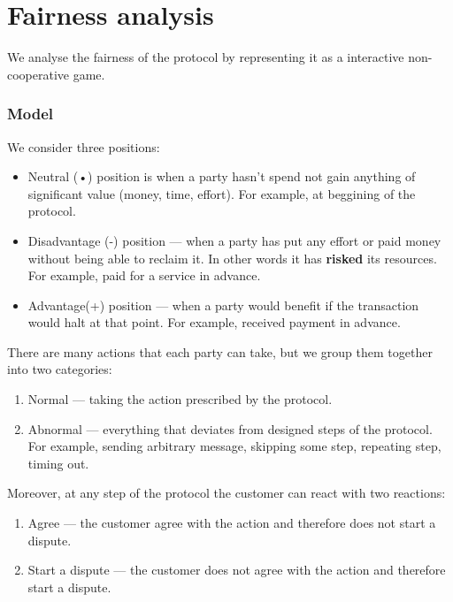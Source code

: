 \documentclass{ieeeaccess}
\begin{document}
\section{Fairness analysis}
We analyse the fairness of the protocol by representing it as a
interactive non-cooperative game.

\subsubsection{Model}\label{model}

We consider three positions:

\begin{itemize}
\item
  Neutral (•) position is when a party hasn't spend not gain anything of
  significant value (money, time, effort). For example, at beggining of
  the protocol.
\item
  Disadvantage (-) position — when a party has put any effort or paid
  money without being able to reclaim it. In other words it has
  \textbf{risked} its resources. For example, paid for a service in
  advance.
\item
  Advantage(+) position — when a party would benefit if the
  transaction would halt at that point. For example, received payment in
  advance.
\end{itemize}

There are many actions that each party can take, but we group them
together into two categories:

\begin{enumerate}
\def\labelenumi{\arabic{enumi}.}

\item
  Normal --- taking the action prescribed by the protocol.
\item
  Abnormal --- everything that deviates from designed steps of the
  protocol. For example, sending arbitrary message, skipping some step,
  repeating step, timing out.
\end{enumerate}

Moreover, at any step of the protocol the customer can react with two
reactions:

\begin{enumerate}
\def\labelenumi{\arabic{enumi}.}

\item
  Agree --- the customer agree with the action and therefore does not
  start a dispute.
\item
  Start a dispute --- the customer does not agree with the action and
  therefore start a dispute.
\end{enumerate}
\end{document}
